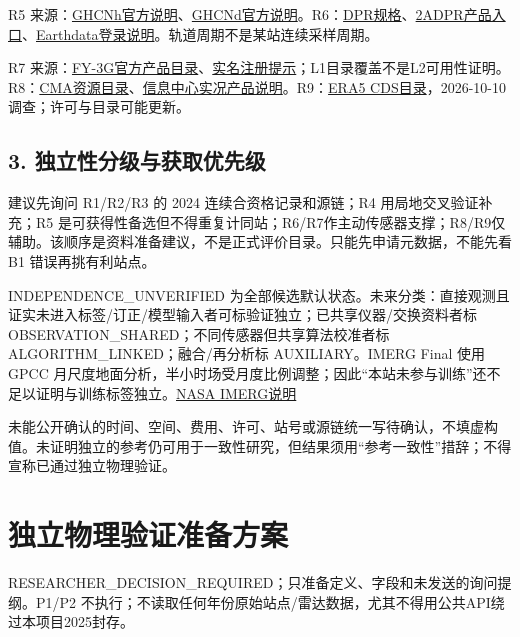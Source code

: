 \documentclass[UTF8,fontset=fandol,10pt]{ctexart}
\begin{document}
R5 来源：\href{https://www.ncei.noaa.gov/products/global-historical-climatology-network-hourly}{GHCNh官方说明}、\href{https://www.ncei.noaa.gov/products/land-based-station/global-historical-climatology-network-daily}{GHCNd官方说明}。R6：\href{https://gpm.nasa.gov/missions/GPM/DPR}{DPR规格}、\href{https://gpm.nasa.gov/data/directory/2a-dpr-ges-disc}{2ADPR产品入口}、\href{https://urs.earthdata.nasa.gov/documentation}{Earthdata登录说明}。轨道周期不是某站连续采样周期。

R7 来源：\href{https://satellite.nsmc.org.cn/DataPortal/cn/data/dataset.html?satelliteCode=FY3G}{FY-3G官方产品目录}、\href{https://satellite.nsmc.org.cn/}{实名注册提示}；L1目录覆盖不是L2可用性证明。R8：\href{https://k.data.cma.cn/mekb/?r=site\%2Findexdata}{CMA资源目录}、\href{https://k.data.cma.cn/mekb/?id=42617&r=site\%2Farticle}{信息中心实况产品说明}。R9：\href{https://cds.climate.copernicus.eu/datasets/reanalysis-era5-single-levels?tab=overview}{ERA5 CDS目录}，2026-10-10调查；许可与目录可能更新。

\subsection{3. 独立性分级与获取优先级}

建议先询问 R1/\allowbreak{}R2/\allowbreak{}R3 的 2024 连续合资格记录和源链；R4 用局地交叉验证补充；R5 是可获得性备选但不得重复计同站；R6/\allowbreak{}R7作主动传感器支撑；R8/\allowbreak{}R9仅辅助。该顺序是资料准备建议，不是正式评价目录。只能先申请元数据，不能先看 B1 错误再挑有利站点。

INDEPENDENCE\_\allowbreak{}UNVERIFIED 为全部候选默认状态。未来分类：直接观测且证实未进入标签/\allowbreak{}订正/\allowbreak{}模型输入者可标验证独立；已共享仪器/\allowbreak{}交换资料者标 OBSERVATION\_\allowbreak{}SHARED；不同传感器但共享算法校准者标 ALGORITHM\_\allowbreak{}LINKED；融合/\allowbreak{}再分析标 AUXILIARY。IMERG Final 使用 GPCC 月尺度地面分析，半小时场受月度比例调整；因此“本站未参与训练”还不足以证明与训练标签独立。\href{https://gpm.nasa.gov/data/imerg}{NASA IMERG说明}

未能公开确认的时间、空间、费用、许可、站号或源链统一写待确认，不填虚构值。未证明独立的参考仍可用于一致性研究，但结果须用“参考一致性”措辞；不得宣称已通过独立物理验证。
\clearpage\section{独立物理验证准备方案}

RESEARCHER\_\allowbreak{}DECISION\_\allowbreak{}REQUIRED；只准备定义、字段和未发送的询问提纲。P1/\allowbreak{}P2 不执行；不读取任何年份原始站点/\allowbreak{}雷达数据，尤其不得用公共API绕过本项目2025封存。
\end{document}
